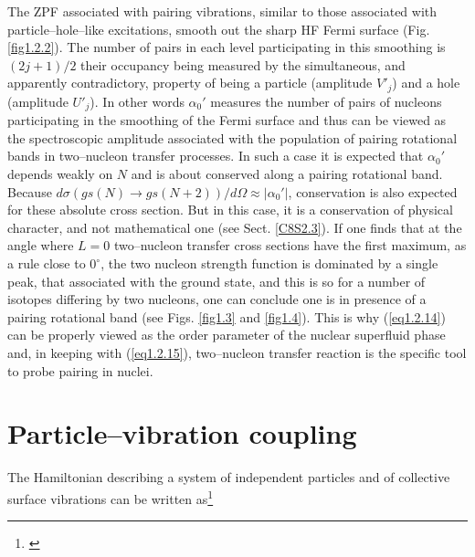 The ZPF associated with pairing vibrations, similar to those associated with particle--hole--like excitations,  smooth out the sharp HF Fermi surface (Fig. \ref{fig1.2.2}). The number of pairs in each level participating in this smoothing is $(2j+1)/2$ their occupancy being measured by the simultaneous, and apparently contradictory, property of being a particle (amplitude $V'_j$) and a hole (amplitude $U'_j$). In other words $\alpha_0'$ measures the number of pairs of nucleons participating in the smoothing of the Fermi surface and thus can be viewed as the spectroscopic amplitude associated with the population of pairing rotational bands in two--nucleon transfer processes. In such a case it is expected that $\alpha_0'$ depends weakly on $N$ and is about conserved along a pairing rotational band. Because $d\sigma(gs(N)\rightarrow gs(N+2))/d\Omega\approx|\alpha_0'|$, conservation is also expected for these absolute cross section. But in this case, it is a conservation of physical character, and not mathematical one (see Sect. \ref{C8S2.3}). If one finds that at the angle where $L=0$ two--nucleon transfer cross sections have the first maximum, as a rule close to $0^\circ$, the two nucleon strength function is dominated by a single peak, that associated with the ground state, and this is so for a number of isotopes differing by two nucleons, one can conclude one is in presence of a pairing rotational band (see Figs. \ref{fig1.3} and \ref{fig1.4}). This is why (\ref{eq1.2.14}) can be properly viewed as the order parameter of the nuclear superfluid phase and, in keeping with (\ref{eq1.2.15}), two--nucleon transfer reaction is the specific tool to probe pairing in nuclei.
\section{Particle--vibration coupling}\label{appintroD}
The Hamiltonian describing a system of independent particles and of collective surface vibrations can be written as\footnote{\cite{Bohr:75,Brink:05}}

